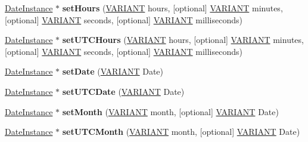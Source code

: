 \begin{DoxyCompactItemize}
\hyperlink{interface_j_s_global_1_1_date_instance}{Date\+Instance} $\ast$ {\bfseries set\+Hours} (\hyperlink{structtag_v_a_r_i_a_n_t}{V\+A\+R\+I\+A\+NT} hours, \mbox{[}optional\mbox{]} \hyperlink{structtag_v_a_r_i_a_n_t}{V\+A\+R\+I\+A\+NT} minutes, \mbox{[}optional\mbox{]} \hyperlink{structtag_v_a_r_i_a_n_t}{V\+A\+R\+I\+A\+NT} seconds, \mbox{[}optional\mbox{]} \hyperlink{structtag_v_a_r_i_a_n_t}{V\+A\+R\+I\+A\+NT} milliseconds)
\item 
\mbox{\label{interface_j_s_global_1_1_date_instance_a02ddcbcb4e25346b499f603a4cb15003}} 
\hyperlink{interface_j_s_global_1_1_date_instance}{Date\+Instance} $\ast$ {\bfseries set\+U\+T\+C\+Hours} (\hyperlink{structtag_v_a_r_i_a_n_t}{V\+A\+R\+I\+A\+NT} hours, \mbox{[}optional\mbox{]} \hyperlink{structtag_v_a_r_i_a_n_t}{V\+A\+R\+I\+A\+NT} minutes, \mbox{[}optional\mbox{]} \hyperlink{structtag_v_a_r_i_a_n_t}{V\+A\+R\+I\+A\+NT} seconds, \mbox{[}optional\mbox{]} \hyperlink{structtag_v_a_r_i_a_n_t}{V\+A\+R\+I\+A\+NT} milliseconds)
\item 
\mbox{\label{interface_j_s_global_1_1_date_instance_a71edaff9399047896273630a81ba7c22}} 
\hyperlink{interface_j_s_global_1_1_date_instance}{Date\+Instance} $\ast$ {\bfseries set\+Date} (\hyperlink{structtag_v_a_r_i_a_n_t}{V\+A\+R\+I\+A\+NT} Date)
\item 
\mbox{\label{interface_j_s_global_1_1_date_instance_a8f801bbb879b015a3e1ac76ffdfe9c6a}} 
\hyperlink{interface_j_s_global_1_1_date_instance}{Date\+Instance} $\ast$ {\bfseries set\+U\+T\+C\+Date} (\hyperlink{structtag_v_a_r_i_a_n_t}{V\+A\+R\+I\+A\+NT} Date)
\item 
\mbox{\label{interface_j_s_global_1_1_date_instance_a37242732be37fb213f33852dadfbf101}} 
\hyperlink{interface_j_s_global_1_1_date_instance}{Date\+Instance} $\ast$ {\bfseries set\+Month} (\hyperlink{structtag_v_a_r_i_a_n_t}{V\+A\+R\+I\+A\+NT} month, \mbox{[}optional\mbox{]} \hyperlink{structtag_v_a_r_i_a_n_t}{V\+A\+R\+I\+A\+NT} Date)
\item 
\mbox{\label{interface_j_s_global_1_1_date_instance_a8c067c4ca9fcba5e2a602fe39cf12b9d}} 
\hyperlink{interface_j_s_global_1_1_date_instance}{Date\+Instance} $\ast$ {\bfseries set\+U\+T\+C\+Month} (\hyperlink{structtag_v_a_r_i_a_n_t}{V\+A\+R\+I\+A\+NT} month, \mbox{[}optional\mbox{]} \hyperlink{structtag_v_a_r_i_a_n_t}{V\+A\+R\+I\+A\+NT} Date)

\end{DoxyCompactItemize}

